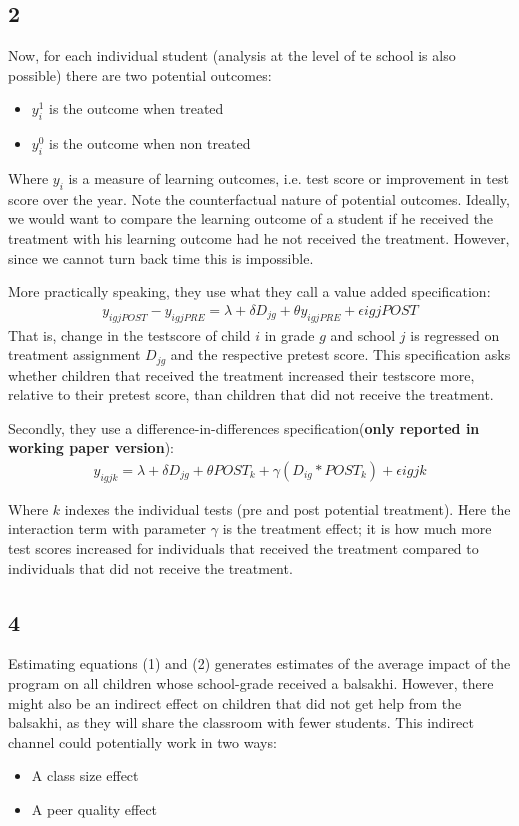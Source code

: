 \documentclass[a4paper]{article}
\begin{document}
	\subsection*{2}
	
	Now, for each individual student (analysis at the level of te school is also possible) there are two potential outcomes:
	\begin{itemize}
	\item $y_i^1$ is the outcome when treated
	\item $y_i^0$ is the outcome when non treated
\end{itemize}
Where $y_i$ is a measure of learning outcomes, i.e. test score or improvement in test score over the year. Note the counterfactual nature of potential outcomes. Ideally, we would want to compare the learning outcome of a student if he received the treatment with his learning outcome had he not received the treatment. However, since we cannot turn back time this is impossible. 

More practically speaking, they use what they call a value added specification:
\begin{align}
y_{igjPOST}-y_{igjPRE}=\lambda +\delta D_{jg}+\theta y_{igjPRE}+\epsilon{igjPOST} 
\end{align}
That is, change in the testscore of child $i$ in grade $g$ and school $j$ is regressed on treatment assignment $D_{jg}$ and the respective pretest score. This specification asks whether children that received the treatment increased their testscore more, relative to their pretest score, than children that did not receive the treatment.  

Secondly, they use a difference-in-differences specification(\textbf{only reported in working paper version}):
\begin{align}
y_{igjk}=\lambda +\delta D_{jg}+\theta POST_{k}+\gamma(D_{ig}*POST_k)+\epsilon{igjk} 
\end{align}

Where $k$ indexes the individual tests (pre and post potential treatment). Here the interaction term with parameter $\gamma$ is the treatment effect; it is how much more test scores increased for individuals that received the treatment compared to individuals that did not receive the treatment.  

\subsection*{4}

Estimating equations (1) and (2) generates estimates of the average impact of the program on
all children whose school-grade received a balsakhi. However, there might also be an indirect effect on children that did not get help from the balsakhi, as they will share the classroom with fewer students. This indirect channel could potentially work in two ways: 
\begin{itemize}
	\item A class size effect
	\item A peer quality effect 
\end{itemize}
\end{document}
